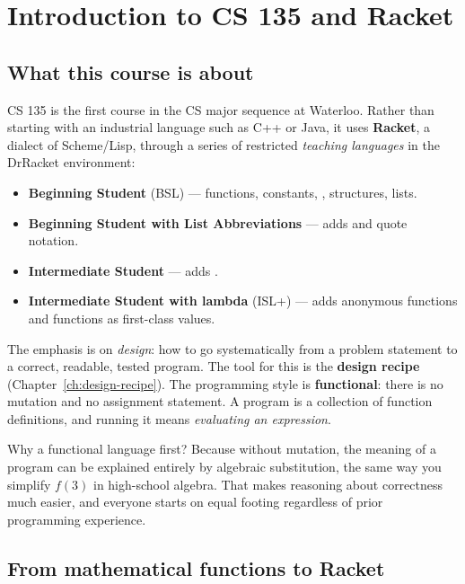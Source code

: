 \chapter{Introduction to CS 135 and Racket}

\section{What this course is about}

CS 135 is the first course in the CS major sequence at Waterloo. Rather than
starting with an industrial language such as C++ or Java, it uses
\textbf{Racket}, a dialect of Scheme/Lisp, through a series of restricted
\emph{teaching languages} in the DrRacket environment:
\begin{itemize}
  \item \textbf{Beginning Student} (BSL) --- functions, constants, , structures, lists.
  \item \textbf{Beginning Student with List Abbreviations} --- adds  and quote notation.
  \item \textbf{Intermediate Student} --- adds .
  \item \textbf{Intermediate Student with lambda} (ISL+) --- adds anonymous functions and functions as first-class values.
\end{itemize}

The emphasis is on \emph{design}: how to go systematically from a problem
statement to a correct, readable, tested program. The tool for this is the
\textbf{design recipe} (Chapter~\ref{ch:design-recipe}). The programming style
is \textbf{functional}: there is no mutation and no assignment statement. A
program is a collection of function definitions, and running it means
\emph{evaluating an expression}.

\begin{aside}
Why a functional language first? Because without mutation, the meaning of a
program can be explained entirely by algebraic substitution, the same way you
simplify $f(3)$ in high-school algebra. That makes reasoning about correctness
much easier, and everyone starts on equal footing regardless of prior
programming experience.
\end{aside}

\section{From mathematical functions to Racket}

